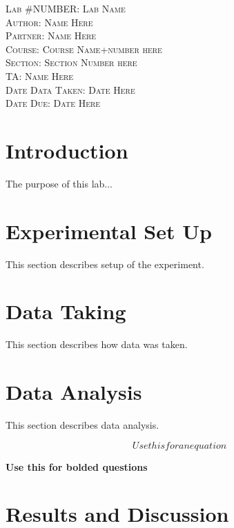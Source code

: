 \documentclass[a4paper,12pt]{article}
\begin{document}
\begin{titlepage}
\begin{center}
\textsc{\LARGE Lab \#NUMBER: Lab Name}\\[1.5cm]
\textsc{\Large Author: Name Here}\\[0.5cm]
\textsc{Partner: Name Here}\\[0.5cm]
\textsc{Course: Course Name+number here}\\[0.5cm]
\textsc{Section: Section Number here}\\[0.5cm]
\textsc{TA: Name Here}\\[0.5cm]
\textsc{Date Data Taken: Date Here}\\[0.5cm]
\textsc{Date Due: Date Here}\\[0.5cm]

\end{center}


\end{titlepage}



\section*{Introduction}
The purpose of this lab...


\section*{Experimental Set Up}
This section describes setup of the experiment. 


\section*{Data Taking}
This section describes how data was taken. 


\section*{Data Analysis}
This section describes data analysis. 


\begin{equation}
Use this for an equation
\end{equation}

\textbf{Use this for bolded questions}


\section*{Results and Discussion}
\end{document}
